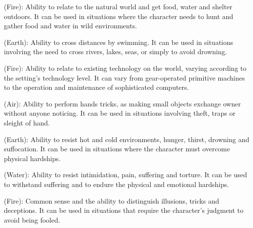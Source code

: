 \begin{multicols}{2}
\begin{ffcolpage}
 (Fire): Ability to relate to the natural world and get food, water and shelter outdoors. It can be used in situations where the character needs to hunt and gather food and water in wild environments.
\end{ffcolpage} \pw

\begin{ffcolpage}
 (Earth): Ability to cross distances by swimming. It can be used in situations involving the need to cross rivers, lakes, seas, or simply to avoid drowning.
\end{ffcolpage} \pw

\begin{ffcolpage}
 (Fire): Ability to relate to existing technology on the world, varying according to the setting’s technology level. It can vary from gear-operated primitive machines to the operation and maintenance of sophisticated computers.
\end{ffcolpage} \pw

\begin{ffcolpage}
 (Air): Ability to perform hands tricks, as making small objects exchange owner without anyone noticing. It can be used in situations involving theft, traps or sleight of hand.
\end{ffcolpage} \pw

\begin{ffcolpage}
 (Earth): Ability to resist hot and cold environments, hunger, thirst, drowning and suffocation. It can be used in situations where the character must overcome physical hardships.
\end{ffcolpage} \pw

\begin{ffcolpage}
 (Water): Ability to resist intimidation, pain, suffering and torture. It can be used to withstand suffering and to endure the physical and emotional hardships.
\end{ffcolpage} \pw

\begin{ffcolpage}
 (Fire): Common sense and the ability to distinguish illusions, tricks and deceptions. It can be used in situations that require the character’s judgment to avoid being fooled.
\end{ffcolpage}
\end{multicols}


